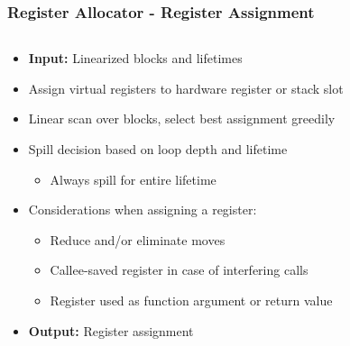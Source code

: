\documentclass[navbaroff,en]{sdqbeamer}
\begin{document}
\begin{frame}
\frametitle{Register Allocator - Register Assignment}

\begin{columns}
	\begin{column}{0.7\textwidth}
		\begin{itemize}
			\item \textbf{Input:} Linearized blocks and lifetimes
			\item Assign virtual registers to hardware register or stack slot
			\item Linear scan over blocks, select best assignment greedily
			\item Spill decision based on loop depth and lifetime 
			\begin{itemize}
				\item Always spill for entire lifetime
			\end{itemize}
			\item Considerations when assigning a register:
			\begin{itemize}
				\item Reduce and/or eliminate moves
				\item Callee-saved register in case of interfering calls
				\item Register used as function argument or return value
			\end{itemize}
			\item \textbf{Output:} Register assignment
		\end{itemize}
	\end{column}
	

\end{columns}
\end{frame}
\end{document}
